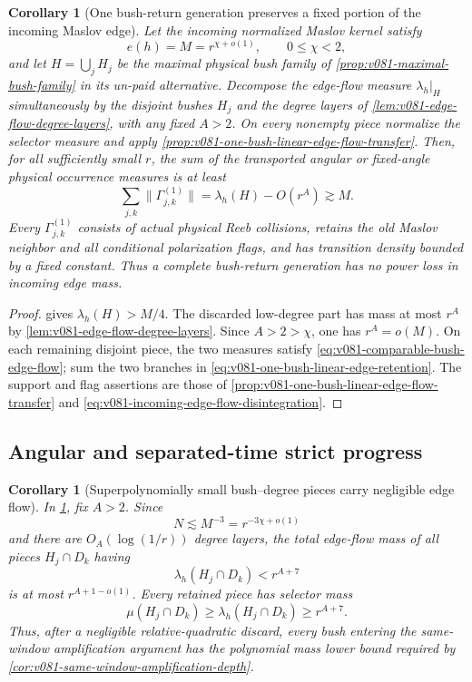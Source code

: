 \documentclass[10pt]{article}
\newtheorem{corollary}[theorem]{Corollary}
\begin{document}
\begin{corollary}[One bush-return generation preserves a fixed portion of the incoming Maslov edge]
\label{cor:v081-one-generation-edge-flow-conservation}
Let the incoming normalized Maslov kernel satisfy
\[
e(h)=M=r^{\chi+o(1)},
\qquad 0\le\chi<2,
\]
and let \(H=\bigcup_jH_j\) be the maximal physical bush family of
\cref{prop:v081-maximal-bush-family} in its un-paid alternative.  Decompose the edge-flow measure
\(\lambda_h|_H\) simultaneously by the disjoint bushes \(H_j\) and the degree layers of
\cref{lem:v081-edge-flow-degree-layers}, with any fixed \(A>2\).  On every nonempty piece normalize
the selector measure and apply
\cref{prop:v081-one-bush-linear-edge-flow-transfer}.  Then, for all sufficiently small \(r\), the
sum of the transported angular or fixed-angle physical occurrence measures is at least
\begin{equation}
\label{eq:v081-one-generation-edge-flow-conservation}
\boxed{
\sum_{j,k}\|\Gamma_{j,k}^{(1)}\|
=
\lambda_h(H)-O(r^A)
\gtrsim M.
}
\end{equation}
Every \(\Gamma_{j,k}^{(1)}\) consists of actual physical Reeb collisions, retains the old Maslov
neighbor and all conditional polarization flags, and has transition density bounded by a fixed
constant.  Thus a complete bush-return generation has no power loss in incoming edge mass.
\end{corollary}

\begin{proof}
 gives
\(\lambda_h(H)>M/4\).  The discarded low-degree part has mass at most \(r^A\) by
\cref{lem:v081-edge-flow-degree-layers}.  Since \(A>2>\chi\), one has \(r^A=o(M)\).  On each
remaining disjoint piece, the two measures satisfy
\eqref{eq:v081-comparable-bush-edge-flow}; sum the two branches in
\eqref{eq:v081-one-bush-linear-edge-retention}.  The support and flag assertions are those of
\cref{prop:v081-one-bush-linear-edge-flow-transfer} and
\eqref{eq:v081-incoming-edge-flow-disintegration}.
\end{proof}

\subsection{Angular and separated-time strict progress}

\begin{corollary}[Superpolynomially small bush--degree pieces carry negligible edge flow]
\label{cor:v081-polynomial-edge-flow-pieces}
In \cref{cor:v081-one-generation-edge-flow-conservation}, fix \(A>2\).  Since
\[
N\lesssim M^{-3}=r^{-3\chi+o(1)}
\]
and there are \(O_A(\log(1/r))\) degree layers, the total edge-flow mass of all pieces
\(H_j\cap D_k\) having
\[
\lambda_h(H_j\cap D_k)<r^{A+7}
\]
is at most \(r^{A+1-o(1)}\).  Every retained piece has selector mass
\[
\mu(H_j\cap D_k)\ge\lambda_h(H_j\cap D_k)\ge r^{A+7}.
\]
Thus, after a negligible relative-quadratic discard, every bush entering the same-window
amplification argument has the polynomial mass lower bound required by
\cref{cor:v081-same-window-amplification-depth}.
\end{corollary}
\end{document}
